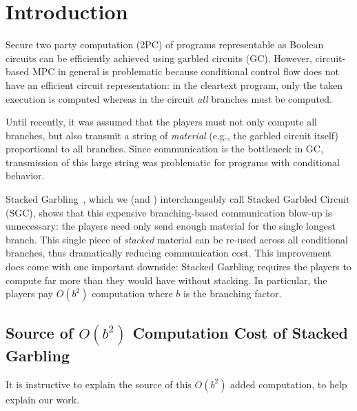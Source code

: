 \section{Introduction}\label{sec:intro}

Secure two party computation (2PC) of programs representable as Boolean circuits can be efficiently achieved using garbled circuits (GC).
%
However,  circuit-based MPC in general is problematic because conditional
control flow does not have an efficient circuit representation:
in the cleartext program, only the taken execution is computed whereas in
the circuit \emph{all} branches must be computed.

%
Until recently, it was assumed that the players must not only compute
all branches, but also transmit a string of \emph{material} (e.g., the garbled circuit itself) 
proportional to all branches.  
Since communication is the bottleneck in GC, transmission of this large string was
problematic for programs with conditional behavior.

Stacked Garbling~\HK, which we (and \HK)  interchangeably call Stacked Garbled Circuit (SGC), shows that
this expensive branching-based communication blow-up is unnecessary: the players need only
send enough material for the single longest branch. This single
piece of \emph{stacked} material can be re-used across all conditional branches, thus
dramatically reducing communication cost.
%
This improvement does come with one important downside:
Stacked Garbling requires the players to compute far more than they
would have without stacking.
In particular, the players pay $O(b^2)$ computation where $b$ is the
branching factor.

\subsection{Source of $O(b^2)$ Computation Cost of Stacked Garbling }
\label{sec:bsquaredcost}

It is instructive to explain the source of this $O(b^2)$ added computation, to help explain our work.

